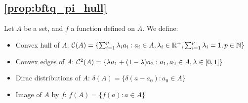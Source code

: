\subsection{\autoref{prop:bftq_pi_hull}}
\label{sec:proof_pi_hull}
\begin{definition}
Let $A$ be a set, and $f$ a function defined on $A$. We define:

\begin{itemize}
    \item Convex hull of $A$: $\mathcal{C}(A) = \{\sum_{i=1}^p \lambda_i a_i: a_i\in A, \lambda_i\in\mathbb{R}^+, \sum_{i=1}^p \lambda_i = 1, p\in\mathbb{N}\}$
    \item Convex edges of $A$: $\mathcal{C}^2(A) = \{\lambda a_1 + (1-\lambda)a_2: a_1, a_2\in A, \lambda\in[0, 1]\}$
    \item Dirac distributions of $A$: $\delta(A) = \{\delta(a-a_0): a_0\in A\}$ 
    \item Image of $A$ by $f$: $f(A) = \{f(a): a\in A\}$
\end{itemize}
\end{definition}

